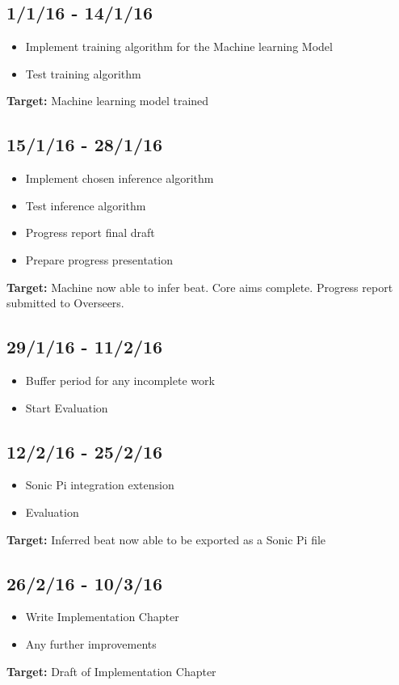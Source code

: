 \documentclass[12pt,a4]{article}
\begin{document}
        \subsection{1/1/16 - 14/1/16}
\begin{itemize}
        \item Implement training algorithm for the Machine learning Model
        \item Test training algorithm

\end{itemize}
{\bf Target:} Machine learning model trained
        \subsection{15/1/16 - 28/1/16}
\begin{itemize}
        \item Implement chosen inference algorithm
        \item Test inference algorithm
        \item Progress report final draft
        \item Prepare progress presentation
\end{itemize}
{\bf Target:} Machine now able to infer beat. Core aims complete. Progress report submitted to Overseers.
        \subsection{29/1/16 - 11/2/16}
        \begin{itemize}
            \item Buffer period for any incomplete work
            \item Start Evaluation
        \end{itemize}
        \subsection{12/2/16 - 25/2/16}
        \begin{itemize}
            \item Sonic Pi integration extension
            \item Evaluation
        \end{itemize}
        {\bf Target:} Inferred beat now able to be exported as a Sonic Pi file
        \subsection{26/2/16 - 10/3/16}
        \begin{itemize}
            \item Write Implementation Chapter
            \item Any further improvements
        \end{itemize}
{\bf Target:} Draft of Implementation Chapter
\end{document}
